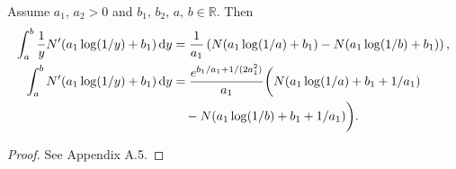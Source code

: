 	\begin{lemma}
		\label{lem:2a}
		Assume $a_1, \, a_2 > 0$ and $b_1, \, b_2, \, a, \, b \in \mathbb{R}$. Then
			\begin{equation}
				\nonumber
				\begin{split}
				\int_a^b \frac{1}{y} N'(a_1\log(1/y)+b_1) \, \mathrm d y &= \frac{1}{a_1}\left( N(a_1\log(1/a) + b_1) - N(a_1\log(1/b)+ b_1)  \right), \\
				\int_a^b N'(a_1\log(1/y)+b_1) \, \mathrm d y &= \frac{e^{b_1/a_1+1/(2a_1^2)}}{a_1}\bigg( N(a_1\log(1/a) + b_1 + 1/a_1) \\
				&{} \quad - N(a_1\log(1/b)+b_1+1/a_1) \bigg).
				\end{split}
			\end{equation}
	\end{lemma}
	\begin{proof}
		See Appendix A.5.
	\end{proof}

